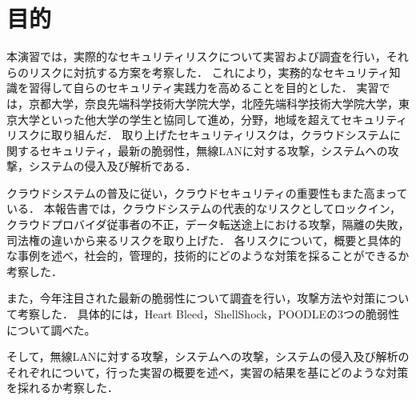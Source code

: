 \section{目的}
本演習では，実際的なセキュリティリスクについて実習および調査を行い，それらのリスクに対抗する方案を考察した．
これにより，実務的なセキュリティ知識を習得して自らのセキュリティ実践力を高めることを目的とした．
実習では，京都大学，奈良先端科学技術大学院大学，北陸先端科学技術大学院大学，東京大学といった他大学の学生と協同して進め，分野，地域を超えてセキュリティリスクに取り組んだ．
取り上げたセキュリティリスクは，クラウドシステムに関するセキュリティ，最新の脆弱性，無線LANに対する攻撃，システムへの攻撃，システムの侵入及び解析である．

クラウドシステムの普及に従い，クラウドセキュリティの重要性もまた高まっている．
本報告書では，クラウドシステムの代表的なリスクとしてロックイン，クラウドプロバイダ従事者の不正，データ転送途上における攻撃，隔離の失敗，司法権の違いから来るリスクを取り上げた．
各リスクについて，概要と具体的な事例を述べ，社会的，管理的，技術的にどのような対策を採ることができるか考察した．

また，今年注目された最新の脆弱性について調査を行い，攻撃方法や対策について考察した．
具体的には，Heart Bleed，ShellShock，POODLEの3つの脆弱性について調べた。

そして，無線LANに対する攻撃，システムへの攻撃，システムの侵入及び解析のそれぞれについて，行った実習の概要を述べ，実習の結果を基にどのような対策を採れるか考察した．
